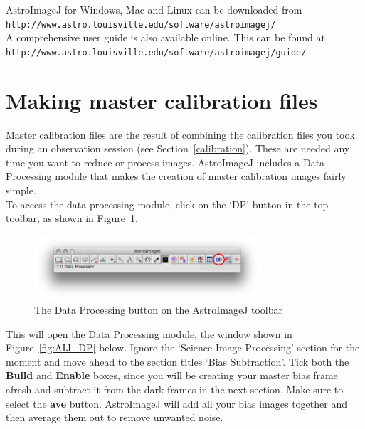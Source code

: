 \documentclass[12pt,twoside,a4paper]{report}
\begin{document}
AstroImageJ for Windows, Mac and Linux can be downloaded from\\
{\tt http://www.astro.louisville.edu/software/astroimagej/}\\

A comprehensive user guide is also available online. This can be found at\\
{\tt http://www.astro.louisville.edu/software/astroimagej/guide/}

\section{Making master calibration files}
Master calibration files are the result of combining the calibration files you took during an observation session (see Section~\ref{calibration}). These are needed any time you want to reduce or process images. AstroImageJ includes a Data Processing module that makes the creation of master calibration images fairly simple.\\

To access the data processing module, click on the `DP' button in the top toolbar, as shown in Figure~\ref{fig:AIJtoolbar}.

\begin{figure}[ht]
  \centering
    \includegraphics[width=0.75\textwidth]{documentation_images/AIJtoolbar.jpg}
    \caption{\label{fig:AIJtoolbar}The Data Processing button on the AstroImageJ toolbar}
 \end{figure}

 This will open the Data Processing module, the window shown in Figure~\ref{fig:AIJ_DP} below. Ignore the `Science Image Processing' section for the moment and move ahead to the section titles `Bias Subtraction'. Tick both the \textbf{Build} and \textbf{Enable} boxes, since you will be creating your master bias frame afresh and subtract it from the dark frames in the next section. Make sure to select the \textbf{ave} button. AstroImageJ will add all your bias images together and then average them out to remove unwanted noise.\\
\end{document}
